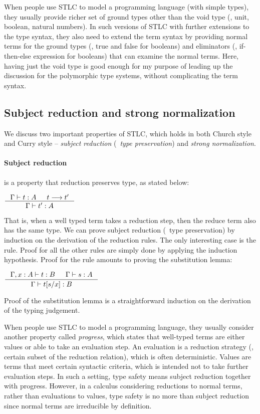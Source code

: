 When people use STLC to model a programming language (with simple types),
they usually provide richer set of ground types other than the void type
(\eg, unit, boolean, natural numbers). In such versions of STLC with further
extensions to the type syntax, they also need to extend the term syntax
by providing normal terms for the ground types (\eg, \textsf{true} and
\textsf{false} for booleans) and eliminators (\eg, if-then-else expression for
booleans) that can examine the normal terms. Here, having just the void type
is good enough for my purpose of leading up the discussion for
the polymorphic type systems, without complicating the term syntax.

\subsection{Subject reduction and strong normalization}\label{sec:stlc:srsn}
We discuss two important properties of STLC, which holds in both
Church style and Curry style -- \emph{subject reduction} (\aka\
\emph{type preservation}) and \emph{strong normalization}.

\paragraph{Subject reduction} is a property that reduction preserves type,
as stated below:
\begin{theorem}
	$\inference{\Gamma |- t : A  & t --> t'}{\Gamma |- t' : A}$
\end{theorem}
That is, when a well typed term takes a reduction step, then the reduce term
also has the same type. We can prove subject reduction (\aka\ type preservation)
by induction on the derivation of the reduction rules.
The only interesting case is the  rule. Proof for all
the other rules are simply done by applying the induction hypothesis.
Proof for the \rulename{RedBeta} rule amounts to proving the substitution lemma:
\begin{lemma}[substitution]
$ \inference{\Gamma,x:A |- t : B  & \Gamma |- s : A}{\Gamma |- t[s/x] : B} $
\end{lemma}
Proof of the substitution lemma is a straightforward induction on
the derivation of the typing judgement.

When people use STLC to model a programming language,
they usually consider another property called \emph{progress},
which states that well-typed terms are either values or
able to take an evaluation step. An evaluation is a reduction strategy
(\ie, certain subset of the reduction relation), which is often deterministic.
Values are terms that meet certain syntactic criteria, which is intended not
to take further evaluation steps. In such a setting, type safety means
subject reduction together with progress. However, in a calculus considering
reductions to normal terms, rather than evaluations to values, type safety is
no more than subject reduction since normal terms are irreducible by definition.

